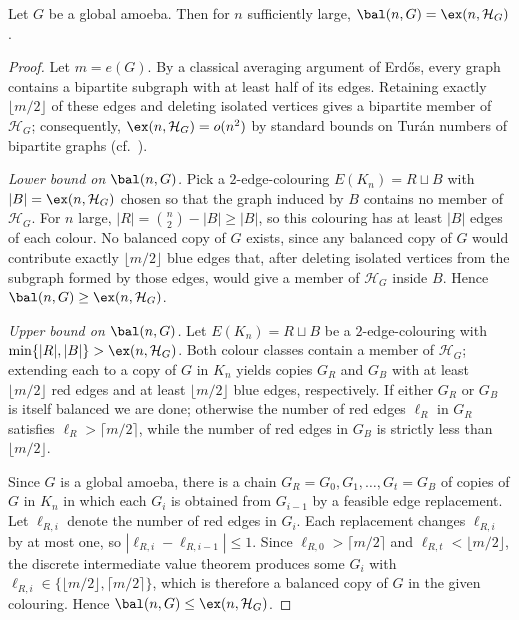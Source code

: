 \begin{theorem}\label{thm:bal_eq_ex}
    Let $G$ be a global amoeba.
    Then for $n$ sufficiently large, $\bal(n,G)=\ex(n,\mathcal H_G)$.
\end{theorem}

\begin{proof}
    Let $m=e(G)$.
    By a classical averaging argument of Erd\H{o}s, every graph contains a bipartite subgraph with at least half of its edges.
    Retaining exactly $\lfloor m/2\rfloor$ of these edges and deleting isolated vertices gives a bipartite member of $\mathcal H_G$; consequently, $\ex(n,\mathcal H_G)=o(n^2)$ by standard bounds on Tur\'an numbers of bipartite graphs (cf.\ \cite[Section~4]{Eslavaetal2025}).

    \emph{Lower bound on $\bal(n,G)$.}
    Pick a $2$-edge-colouring $E(K_n)=R\sqcup B$ with $|B|=\ex(n,\mathcal H_G)$ chosen so that the graph induced by $B$ contains no member of $\mathcal H_G$.
    For $n$ large, $|R|=\binom{n}{2}-|B|\geq |B|$, so this colouring has at least $|B|$ edges of each colour.
    No balanced copy of $G$ exists, since any balanced copy of $G$ would contribute exactly $\lfloor m/2\rfloor$ blue edges that, after deleting isolated vertices from the subgraph formed by those edges, would give a member of $\mathcal H_G$ inside $B$.
    Hence $\bal(n,G)\geq\ex(n,\mathcal H_G)$.

    \emph{Upper bound on $\bal(n,G)$.}
    Let $E(K_n)=R\sqcup B$ be a $2$-edge-colouring with $\min\{|R|,|B|\}>\ex(n,\mathcal H_G)$.
    Both colour classes contain a member of $\mathcal H_G$; extending each to a copy of $G$ in $K_n$ yields copies $G_R$ and $G_B$ with at least $\lfloor m/2\rfloor$ red edges and at least $\lfloor m/2\rfloor$ blue edges, respectively.
    If either $G_R$ or $G_B$ is itself balanced we are done; otherwise the number of red edges $\ell_R$ in $G_R$ satisfies $\ell_R>\lceil m/2\rceil$, while the number of red edges in $G_B$ is strictly less than $\lfloor m/2\rfloor$.

    Since $G$ is a global amoeba, there is a chain $G_R=G_0,G_1,\dots,G_t=G_B$ of copies of $G$ in $K_n$ in which each $G_i$ is obtained from $G_{i-1}$ by a feasible edge replacement.
    Let $\ell_{R,i}$ denote the number of red edges in $G_i$.
    Each replacement changes $\ell_{R,i}$ by at most one, so $|\ell_{R,i}-\ell_{R,i-1}|\leq 1$.
    Since $\ell_{R,0}>\lceil m/2\rceil$ and $\ell_{R,t}<\lfloor m/2\rfloor$, the discrete intermediate value theorem produces some $G_i$ with $\ell_{R,i}\in\{\lfloor m/2\rfloor,\lceil m/2\rceil\}$, which is therefore a balanced copy of $G$ in the given colouring.
    Hence $\bal(n,G)\leq\ex(n,\mathcal H_G)$.
\end{proof}

